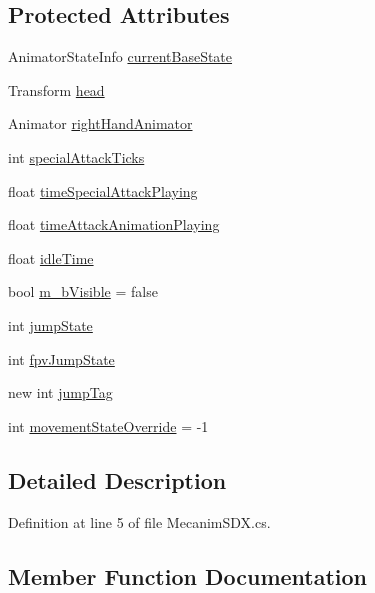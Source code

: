 \subsection*{Protected Attributes}
\begin{DoxyCompactItemize}
\item 
Animator\+State\+Info \mbox{\hyperlink{class_mecanim_s_d_x_acd856103f5cf5dc49047365249114746}{current\+Base\+State}}
\item 
Transform \mbox{\hyperlink{class_mecanim_s_d_x_a7004be4cf215d662e125528e535c3ccb}{head}}
\item 
Animator \mbox{\hyperlink{class_mecanim_s_d_x_aadf138adbe063d5d0015f3a59fbf691e}{right\+Hand\+Animator}}
\item 
int \mbox{\hyperlink{class_mecanim_s_d_x_aeadc8b5a4e12b900436f6aaf27fdd20e}{special\+Attack\+Ticks}}
\item 
float \mbox{\hyperlink{class_mecanim_s_d_x_af8baae6e70c21a065a3c0d9a2860e921}{time\+Special\+Attack\+Playing}}
\item 
float \mbox{\hyperlink{class_mecanim_s_d_x_a71ed5de0e90327527bb210fd2c403ea5}{time\+Attack\+Animation\+Playing}}
\item 
float \mbox{\hyperlink{class_mecanim_s_d_x_af2461d472095e7bb97f519f46b5ab445}{idle\+Time}}
\item 
bool \mbox{\hyperlink{class_mecanim_s_d_x_ac76dc6238cf4c62692fb464810f38117}{m\+\_\+b\+Visible}} = false
\item 
int \mbox{\hyperlink{class_mecanim_s_d_x_a02712a384033b6afd8a456ac010abf52}{jump\+State}}
\item 
int \mbox{\hyperlink{class_mecanim_s_d_x_a3f257cbdb5a2dc773189f70a42cd40e1}{fpv\+Jump\+State}}
\item 
new int \mbox{\hyperlink{class_mecanim_s_d_x_a5e45065b2a61161196a4fceb8945f38d}{jump\+Tag}}
\item 
int \mbox{\hyperlink{class_mecanim_s_d_x_a7e4a7b5ec3b211013bcae20b9518121b}{movement\+State\+Override}} = -\/1
\end{DoxyCompactItemize}


\subsection{Detailed Description}


Definition at line 5 of file Mecanim\+S\+D\+X.\+cs.



\subsection{Member Function Documentation}
\mbox{\label{class_mecanim_s_d_x_a85b7de7f10f8aeb00e377cf3873e0501}} 
